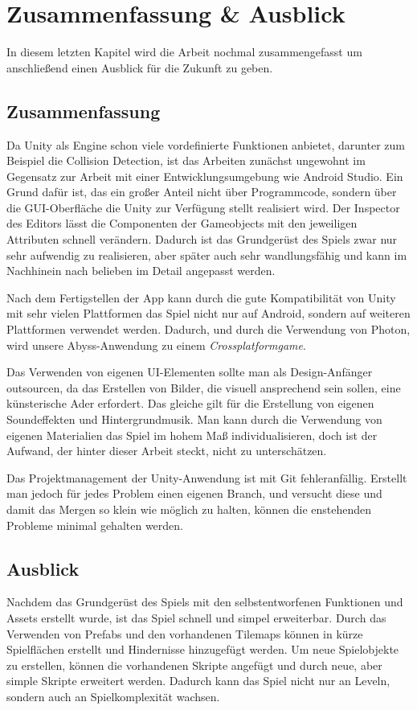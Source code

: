 \chapter{Zusammenfassung \& Ausblick}
\label{cha:zusammenfassungAusblick}
In diesem letzten Kapitel wird die Arbeit nochmal zusammengefasst um anschließend einen Ausblick für die Zukunft zu geben.

\section{Zusammenfassung}
\label{sec:grundlagen:zusammenfassung}
Da Unity als Engine schon viele vordefinierte Funktionen anbietet, darunter zum Beispiel die Collision Detection, ist das Arbeiten zunächst ungewohnt im Gegensatz zur Arbeit mit einer Entwicklungsumgebung wie Android Studio. Ein Grund dafür ist, das ein großer Anteil nicht über Programmcode, sondern über die GUI-Oberfläche die Unity zur Verfügung stellt realisiert wird. Der Inspector des Editors lässt die Componenten der Gameobjects mit den jeweiligen Attributen schnell verändern. Dadurch ist das Grundgerüst des Spiels zwar nur sehr aufwendig zu realisieren, aber später auch sehr wandlungsfähig und kann im Nachhinein nach belieben im Detail angepasst werden. 

Nach dem Fertigstellen der App kann durch die gute Kompatibilität von Unity mit sehr vielen Plattformen das Spiel nicht nur auf Android, sondern auf weiteren Plattformen verwendet werden. Dadurch, und durch die Verwendung von Photon, wird unsere Abyss-Anwendung zu einem \textit{Crossplatformgame}.

Das Verwenden von eigenen UI-Elementen sollte man als Design-Anfänger outsourcen, da das Erstellen von Bilder, die visuell ansprechend sein sollen, eine künsterische Ader erfordert. Das gleiche gilt für die Erstellung von eigenen Soundeffekten und Hintergrundmusik. Man kann durch die Verwendung von eigenen Materialien das Spiel im hohem Maß individualisieren, doch ist der Aufwand, der hinter dieser Arbeit steckt, nicht zu unterschätzen. 

Das Projektmanagement der Unity-Anwendung ist mit Git fehleranfällig. Erstellt man jedoch für jedes Problem einen eigenen Branch, und versucht diese und damit das Mergen so klein wie möglich zu halten, können die enstehenden Probleme minimal gehalten werden.

\section{Ausblick}
\label{sec:grundlagen:ausblick}
Nachdem das Grundgerüst des Spiels mit den selbstentworfenen Funktionen und Assets erstellt wurde, ist das Spiel schnell und simpel erweiterbar. Durch das Verwenden von Prefabs und den vorhandenen Tilemaps können in kürze Spielflächen erstellt und Hindernisse hinzugefügt werden. Um neue Spielobjekte zu erstellen, können die vorhandenen Skripte angefügt und durch neue, aber simple Skripte erweitert werden. Dadurch kann das Spiel nicht nur an Leveln, sondern auch an Spielkomplexität wachsen.